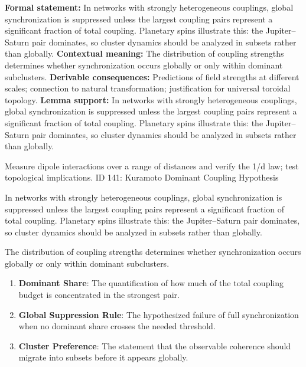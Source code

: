 \begingroup\footnotesize\setlength{\emergencystretch}{3em}\sloppy
\textbf{Formal statement:} In networks with strongly heterogeneous couplings, global synchronization is suppressed unless the largest coupling pairs represent a significant fraction of total coupling. Planetary spins illustrate this: the Jupiter--Saturn pair dominates, so cluster dynamics should be analyzed in subsets rather than globally.
\textbf{Contextual meaning:} The distribution of coupling strengths determines whether synchronization occurs globally or only within dominant subclusters.
\textbf{Derivable consequences:} Predictions of field strengths at different scales; connection to natural transformation; justification for universal toroidal topology.
\textbf{Lemma support:} In networks with strongly heterogeneous couplings, global synchronization is suppressed unless the largest coupling pairs represent a significant fraction of total coupling. Planetary spins illustrate this: the Jupiter--Saturn pair dominates, so cluster dynamics should be analyzed in subsets rather than globally.\par
\endgroup

Measure dipole interactions over a range of distances and verify the 1/d  law; test topological implications. ID 141: Kuramoto Dominant Coupling Hypothesis

In networks with strongly heterogeneous couplings, global synchronization is suppressed unless the largest coupling pairs represent a significant fraction of total coupling. Planetary spins illustrate this: the Jupiter--Saturn pair dominates, so cluster dynamics should be analyzed in subsets rather than globally.

The distribution of coupling strengths determines whether synchronization occurs globally or only within dominant subclusters.
\endgroup

\begin{enumerate}[leftmargin=1.6em,itemsep=6pt,topsep=4pt]
\item \textbf{Dominant Share}: The quantification of how much of the total coupling budget is concentrated in the strongest pair.
\item \textbf{Global Suppression Rule}: The hypothesized failure of full synchronization when no dominant share crosses the needed threshold.
\item \textbf{Cluster Preference}: The statement that the observable coherence should migrate into subsets before it appears globally.
\end{enumerate}

